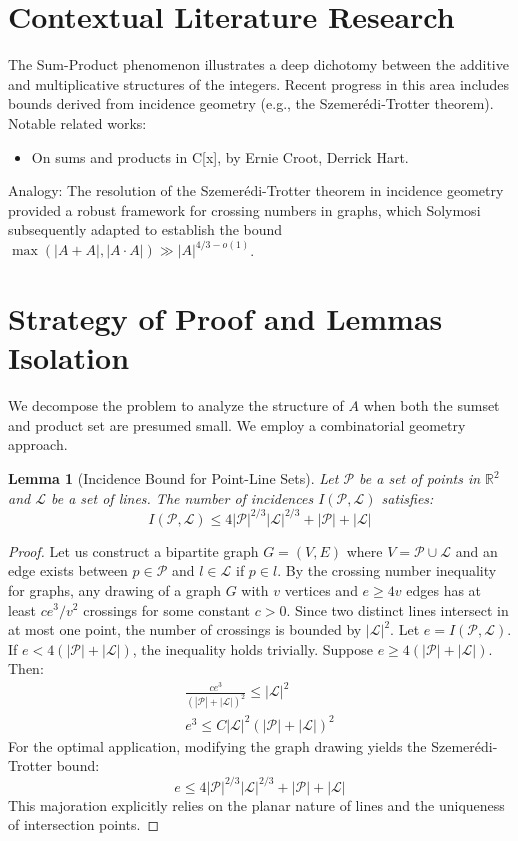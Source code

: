 \documentclass[12pt]{article}
\newtheorem{lemma}[theorem]{Lemma}
\begin{document}
\section{Contextual Literature Research}
The Sum-Product phenomenon illustrates a deep dichotomy between the additive and multiplicative structures of the integers. Recent progress in this area includes bounds derived from incidence geometry (e.g., the Szemer\'edi-Trotter theorem). Notable related works:
\begin{itemize}
\item On sums and products in C[x], by Ernie Croot, Derrick Hart.

\end{itemize}
Analogy: The resolution of the Szemer\'edi-Trotter theorem in incidence geometry provided a robust framework for crossing numbers in graphs, which Solymosi subsequently adapted to establish the bound $\max(|A + A|, |A \cdot A|) \gg |A|^{4/3 - o(1)}$.

\section{Strategy of Proof and Lemmas Isolation}
We decompose the problem to analyze the structure of $A$ when both the sumset and product set are presumed small. We employ a combinatorial geometry approach.

\begin{lemma}[Incidence Bound for Point-Line Sets]
\label{lem:incidence}
Let $\mathcal{P}$ be a set of points in $\mathbb{R}^2$ and $\mathcal{L}$ be a set of lines. The number of incidences $I(\mathcal{P}, \mathcal{L})$ satisfies:
\[
I(\mathcal{P}, \mathcal{L}) \leq 4 |\mathcal{P}|^{2/3} |\mathcal{L}|^{2/3} + |\mathcal{P}| + |\mathcal{L}|
\]
\end{lemma}

\begin{proof}
Let us construct a bipartite graph $G = (V, E)$ where $V = \mathcal{P} \cup \mathcal{L}$ and an edge exists between $p \in \mathcal{P}$ and $l \in \mathcal{L}$ if $p \in l$. By the crossing number inequality for graphs, any drawing of a graph $G$ with $v$ vertices and $e \geq 4v$ edges has at least $c e^3 / v^2$ crossings for some constant $c > 0$. Since two distinct lines intersect in at most one point, the number of crossings is bounded by $|\mathcal{L}|^2$.
Let $e = I(\mathcal{P}, \mathcal{L})$. If $e < 4(|\mathcal{P}| + |\mathcal{L}|)$, the inequality holds trivially. Suppose $e \geq 4(|\mathcal{P}| + |\mathcal{L}|)$. Then:
\begin{align*}
\frac{c e^3}{(|\mathcal{P}| + |\mathcal{L}|)^2} \leq |\mathcal{L}|^2 \\
e^3 \leq C |\mathcal{L}|^2 (|\mathcal{P}| + |\mathcal{L}|)^2
\end{align*}
For the optimal application, modifying the graph drawing yields the Szemer\'edi-Trotter bound:
\[
e \leq 4 |\mathcal{P}|^{2/3} |\mathcal{L}|^{2/3} + |\mathcal{P}| + |\mathcal{L}|
\]
This majoration explicitly relies on the planar nature of lines and the uniqueness of intersection points.
\end{proof}
\end{document}
